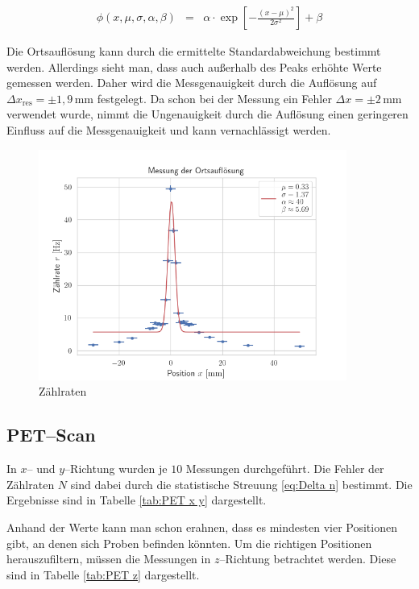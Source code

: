 \documentclass[12pt,a4paper]{scrartcl}
\numberwithin{equation}{section} %
\begin{document}
\begin{eqnarray}
    \phi(x, \mu, \sigma, \alpha, \beta) &=& \alpha\cdot \exp\left[- \frac{(x - \mu)^2}{2\sigma^2} \right] + \beta \label{eq:gauss-fit}
\end{eqnarray}

\noindent
Die Ortsauflösung kann durch die ermittelte Standardabweichung bestimmt werden. Allerdings sieht man, dass auch außerhalb des Peaks erhöhte Werte gemessen werden. Daher wird die Messgenauigkeit durch die Auflösung auf $\Delta x_\mathrm{res}=\pm 1,9\,\mathrm{mm}$ festgelegt. Da schon bei der Messung ein Fehler $\Delta x=\pm 2\,\mathrm{mm}$ verwendet wurde, nimmt die Ungenauigkeit durch die Auflösung einen geringeren Einfluss auf die Messgenauigkeit und kann vernachlässigt werden.

\begin{figure}[h]
	\centering
	\includegraphics[width=0.9\textwidth]{../media/B3.4/Ortsaufloesung_fit.png}
	\caption{Zählraten}
	\label{abb:zaehlrate}
\end{figure}

\clearpage
\hypertarget{petscan}{%
\subsection{PET--Scan}\label{petscan}}
In $x$-- und $y$--Richtung wurden je $10$ Messungen durchgeführt. Die Fehler der Zählraten $N$ sind dabei durch die statistische Streuung \eqref{eq:Delta n} bestimmt. Die Ergebnisse sind in Tabelle \ref{tab:PET x y} dargestellt.

Anhand der Werte kann man schon erahnen, dass es mindesten vier Positionen gibt, an denen sich Proben befinden könnten. Um die richtigen Positionen herauszufiltern, müssen die Messungen in $z$--Richtung betrachtet werden. Diese sind in Tabelle \ref{tab:PET z} dargestellt.
\end{document}
